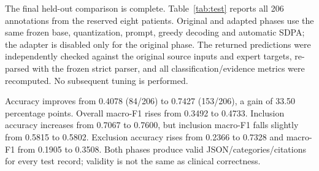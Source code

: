 The final held-out comparison is complete. Table~\ref{tab:test} reports all 206 annotations from the reserved eight patients. Original and adapted phases use the same frozen base, quantization, prompt, greedy decoding and automatic SDPA; the adapter is disabled only for the original phase. The returned predictions were independently checked against the original source inputs and expert targets, re-parsed with the frozen strict parser, and all classification/evidence metrics were recomputed. No subsequent tuning is performed.
\begin{table}[t]\centering\small\caption{Final held-out test results, separate from development validation.}\label{tab:test}\end{table}
Accuracy improves from 0.4078 (84/206) to 0.7427 (153/206), a gain of 33.50 percentage points. Overall macro-F1 rises from 0.3492 to 0.4733. Inclusion accuracy increases from 0.7067 to 0.7600, but inclusion macro-F1 falls slightly from 0.5815 to 0.5802. Exclusion accuracy rises from 0.2366 to 0.7328 and macro-F1 from 0.1905 to 0.3508. Both phases produce valid JSON/categories/citations for every test record; validity is not the same as clinical correctness.

